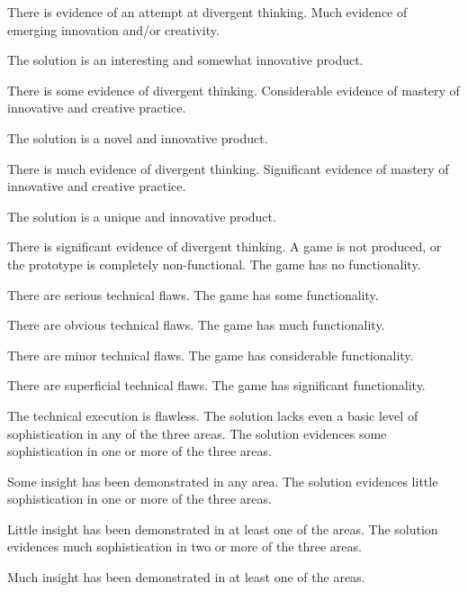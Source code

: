\documentclass{../fal_assignment}
\begin{document}
\begin{markingrubric}
		\par There is evidence of an attempt at divergent thinking.
		\grade Much evidence of emerging innovation and/or creativity.
		\par The solution is an interesting and somewhat innovative product.
		\par There is some evidence of divergent thinking.
		\grade Considerable evidence of mastery of innovative and creative practice.
		\par The solution is a novel and innovative product.
		\par There is much evidence of divergent thinking.
		\grade Significant evidence of mastery of innovative and creative practice.
		\par The solution is a unique and innovative product.
		\par There is significant evidence of divergent thinking.
		\grade\fail A game is not produced, or the prototype is completely non-functional.
		\grade The game has no functionality.
		\par There are serious technical flaws.
		\grade The game has some functionality.
		\par There are obvious technical flaws.
		\grade The game has much functionality.
		\par There are minor technical flaws.
		\grade The game has considerable functionality.
		\par There are superficial technical flaws.
		\grade The game has significant functionality.
		\par The technical execution is flawless.
		\grade\fail The solution lacks even a basic level of sophistication in any of the three areas.
		\grade The solution evidences some sophistication in one or more of the three areas.
		\par Some insight has been demonstrated in any area.
		\grade The solution evidences little sophistication in one or more of the three areas.
		\par Little insight has been demonstrated in at least one of the areas.
		\grade The solution evidences much sophistication in two or more of the three areas.
		\par Much insight has been demonstrated in at least one of the areas.

\end{markingrubric}
\end{document}

